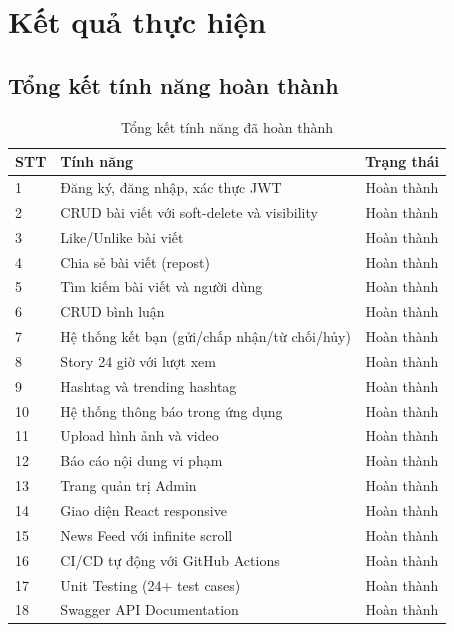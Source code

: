 \documentclass[a4paper]{article}
\begin{document}
\newpage

\section{Kết quả thực hiện}

\subsection{Tổng kết tính năng hoàn thành}

\begin{table}[h!]
\centering
\caption{Tổng kết tính năng đã hoàn thành}
\begin{tabularx}{\textwidth}{|l|X|c|}
\hline
\textbf{STT} & \textbf{Tính năng} & \textbf{Trạng thái} \\
\hline
1 & Đăng ký, đăng nhập, xác thực JWT & \textcolor{dkgreen}{Hoàn thành} \\
\hline
2 & CRUD bài viết với soft-delete và visibility & \textcolor{dkgreen}{Hoàn thành} \\
\hline
3 & Like/Unlike bài viết & \textcolor{dkgreen}{Hoàn thành} \\
\hline
4 & Chia sẻ bài viết (repost) & \textcolor{dkgreen}{Hoàn thành} \\
\hline
5 & Tìm kiếm bài viết và người dùng & \textcolor{dkgreen}{Hoàn thành} \\
\hline
6 & CRUD bình luận & \textcolor{dkgreen}{Hoàn thành} \\
\hline
7 & Hệ thống kết bạn (gửi/chấp nhận/từ chối/hủy) & \textcolor{dkgreen}{Hoàn thành} \\
\hline
8 & Story 24 giờ với lượt xem & \textcolor{dkgreen}{Hoàn thành} \\
\hline
9 & Hashtag và trending hashtag & \textcolor{dkgreen}{Hoàn thành} \\
\hline
10 & Hệ thống thông báo trong ứng dụng & \textcolor{dkgreen}{Hoàn thành} \\
\hline
11 & Upload hình ảnh và video & \textcolor{dkgreen}{Hoàn thành} \\
\hline
12 & Báo cáo nội dung vi phạm & \textcolor{dkgreen}{Hoàn thành} \\
\hline
13 & Trang quản trị Admin & \textcolor{dkgreen}{Hoàn thành} \\
\hline
14 & Giao diện React responsive & \textcolor{dkgreen}{Hoàn thành} \\
\hline
15 & News Feed với infinite scroll & \textcolor{dkgreen}{Hoàn thành} \\
\hline
16 & CI/CD tự động với GitHub Actions & \textcolor{dkgreen}{Hoàn thành} \\
\hline
17 & Unit Testing (24+ test cases) & \textcolor{dkgreen}{Hoàn thành} \\
\hline
18 & Swagger API Documentation & \textcolor{dkgreen}{Hoàn thành} \\
\hline
\end{tabularx}
\end{table}
\end{document}
